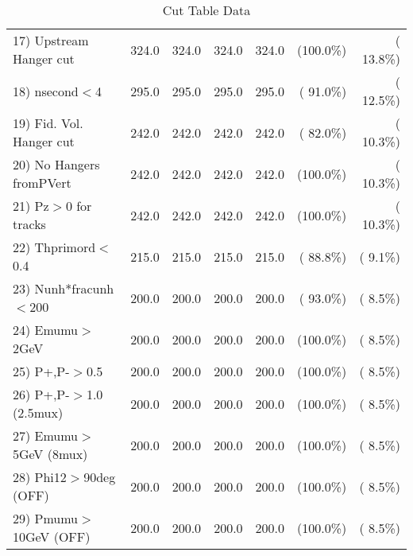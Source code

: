 \begin{table}[h!]
\begin{tabular}{||l||r|r|r|r|r|r||}
 17) Upstream Hanger cut  &        324.0 &        324.0 &        324.0 &        324.0 & (100.0\%) & ( 13.8\%) \\
 18) nsecond$<$4          &        295.0 &        295.0 &        295.0 &        295.0 & ( 91.0\%) & ( 12.5\%) \\
 19) Fid. Vol. Hanger cut &        242.0 &        242.0 &        242.0 &        242.0 & ( 82.0\%) & ( 10.3\%) \\
 20) No Hangers fromPVert &        242.0 &        242.0 &        242.0 &        242.0 & (100.0\%) & ( 10.3\%) \\
 21) Pz$>$0 for tracks    &        242.0 &        242.0 &        242.0 &        242.0 & (100.0\%) & ( 10.3\%) \\
 22) Thprimord$<$0.4      &        215.0 &        215.0 &        215.0 &        215.0 & ( 88.8\%) & (  9.1\%) \\
 23) Nunh*fracunh$<$200   &        200.0 &        200.0 &        200.0 &        200.0 & ( 93.0\%) & (  8.5\%) \\
 24) Emumu$>$2GeV         &        200.0 &        200.0 &        200.0 &        200.0 & (100.0\%) & (  8.5\%) \\
 25) P+,P-$>$0.5          &        200.0 &        200.0 &        200.0 &        200.0 & (100.0\%) & (  8.5\%) \\
 26) P+,P-$>$1.0 (2.5mux) &        200.0 &        200.0 &        200.0 &        200.0 & (100.0\%) & (  8.5\%) \\
 27) Emumu$>$5GeV  (8mux) &        200.0 &        200.0 &        200.0 &        200.0 & (100.0\%) & (  8.5\%) \\
 28) Phi12$>$90deg  (OFF) &        200.0 &        200.0 &        200.0 &        200.0 & (100.0\%) & (  8.5\%) \\
 29) Pmumu$>$10GeV  (OFF) &        200.0 &        200.0 &        200.0 &        200.0 & (100.0\%) & (  8.5\%) \\
 \hline
 \hline
 \end{tabular}
 \caption{Cut Table  Data     }
 \label{tab-cutcohjpsi-mumu_data}
 \end{table}
